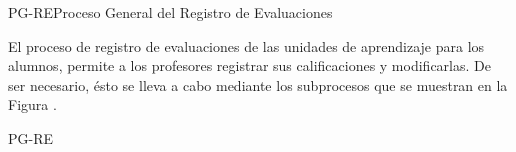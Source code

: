 


\begin{procesoGeneral}{PG-RE}{Proceso General del Registro de Evaluaciones} {
		
		El proceso de registro de evaluaciones de las unidades de aprendizaje para los alumnos, permite a los profesores registrar sus calificaciones y modificarlas. De ser necesario, ésto se lleva a cabo mediante los subprocesos que se muestran en \noindent la Figura .\\
					
		
	}{PG-RE}

\end{procesoGeneral}

